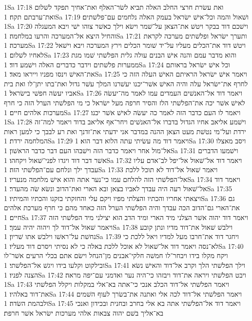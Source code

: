 1Sa 17:18  ואת עשׂרת חרצי החלב האלה תביא לשׂר־האלף ואת־אחיך תפקד לשׁלום ואת־ערבתם תקח׃
1Sa 17:19  ושׁאול והמה וכל־אישׁ ישׂראל בעמק האלה נלחמים עם־פלשׁתים׃
1Sa 17:20  וישׁכם דוד בבקר ויטשׁ את־הצאן על־שׁמר וישׂא וילך כאשׁר צוהו ישׁי ויבא המעגלה והחיל היצא אל־המערכה והרעו במלחמה׃
1Sa 17:21  ותערך ישׂראל ופלשׁתים מערכה לקראת מערכה׃
1Sa 17:22  ויטשׁ דוד את־הכלים מעליו על־יד שׁומר הכלים וירץ המערכה ויבא וישׁאל לאחיו לשׁלום׃
1Sa 17:23  והוא מדבר עמם והנה אישׁ הבנים עולה גלית הפלשׁתי שׁמו מגת ממערות פלשׁתים וידבר כדברים האלה וישׁמע דוד׃
1Sa 17:24  וכל אישׁ ישׂראל בראותם את־האישׁ וינסו מפניו וייראו מאד׃
1Sa 17:25  ויאמר אישׁ ישׂראל הראיתם האישׁ העלה הזה כי לחרף את־ישׂראל עלה והיה האישׁ אשׁר־יכנו יעשׁרנו המלך עשׁר גדול ואת־בתו יתן־לו ואת בית אביו יעשׂה חפשׁי בישׂראל׃
1Sa 17:26  ויאמר דוד אל־האנשׁים העמדים עמו לאמר מה־יעשׂה לאישׁ אשׁר יכה את־הפלשׁתי הלז והסיר חרפה מעל ישׂראל כי מי הפלשׁתי הערל הזה כי חרף מערכות אלהים חיים׃
1Sa 17:27  ויאמר לו העם כדבר הזה לאמר כה יעשׂה לאישׁ אשׁר יכנו׃
1Sa 17:28  וישׁמע אליאב אחיו הגדול בדברו אל־האנשׁים ויחר־אף אליאב בדוד ויאמר למה־זה ירדת ועל־מי נטשׁת מעט הצאן ההנה במדבר אני ידעתי את־זדנך ואת רע לבבך כי למען ראות המלחמה ירדת׃
1Sa 17:29  ויאמר דוד מה עשׂיתי עתה הלוא דבר הוא׃
1Sa 17:30  ויסב מאצלו אל־מול אחר ויאמר כדבר הזה וישׁבהו העם דבר כדבר הראשׁון׃
1Sa 17:31  וישׁמעו הדברים אשׁר דבר דוד ויגדו לפני־שׁאול ויקחהו׃
1Sa 17:32  ויאמר דוד אל־שׁאול אל־יפל לב־אדם עליו עבדך ילך ונלחם עם־הפלשׁתי הזה׃
1Sa 17:33  ויאמר שׁאול אל־דוד לא תוכל ללכת אל־הפלשׁתי הזה להלחם עמו כי־נער אתה והוא אישׁ מלחמה מנעריו׃
1Sa 17:34  ויאמר דוד אל־שׁאול רעה היה עבדך לאביו בצאן ובא הארי ואת־הדוב ונשׂא שׂה מהעדר׃
1Sa 17:35  ויצאתי אחריו והכתיו והצלתי מפיו ויקם עלי והחזקתי בזקנו והכתיו והמיתיו׃
1Sa 17:36  גם את־הארי גם־הדוב הכה עבדך והיה הפלשׁתי הערל הזה כאחד מהם כי חרף מערכת אלהים חיים׃
1Sa 17:37  ויאמר דוד יהוה אשׁר הצלני מיד הארי ומיד הדב הוא יצילני מיד הפלשׁתי הזה ויאמר שׁאול אל־דוד לך ויהוה יהיה עמך׃
1Sa 17:38  וילבשׁ שׁאול את־דוד מדיו ונתן קובע נחשׁת על־ראשׁו וילבשׁ אתו שׁריון׃
1Sa 17:39  ויחגר דוד את־חרבו מעל למדיו ויאל ללכת כי לא־נסה ויאמר דוד אל־שׁאול לא אוכל ללכת באלה כי לא נסיתי ויסרם דוד מעליו׃
1Sa 17:40  ויקח מקלו בידו ויבחר־לו חמשׁה חלקי־אבנים מן־הנחל וישׂם אתם בכלי הרעים אשׁר־לו ובילקוט וקלעו בידו ויגשׁ אל־הפלשׁתי׃
1Sa 17:41  וילך הפלשׁתי הלך וקרב אל־דוד והאישׁ נשׂא הצנה לפניו׃
1Sa 17:42  ויבט הפלשׁתי ויראה את־דוד ויבזהו כי־היה נער ואדמני עם־יפה מראה׃
1Sa 17:43  ויאמר הפלשׁתי אל־דוד הכלב אנכי כי־אתה בא־אלי במקלות ויקלל הפלשׁתי את־דוד באלהיו׃
1Sa 17:44  ויאמר הפלשׁתי אל־דוד לכה אלי ואתנה את־בשׂרך לעוף השׁמים ולבהמת השׂדה׃
1Sa 17:45  ויאמר דוד אל־הפלשׁתי אתה בא אלי בחרב ובחנית ובכידון ואנכי בא־אליך בשׁם יהוה צבאות אלהי מערכות ישׂראל אשׁר חרפת׃
